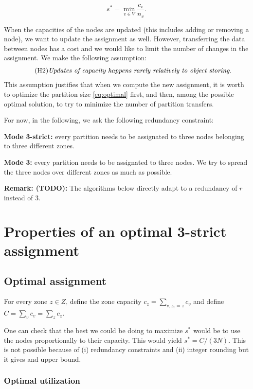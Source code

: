 \documentclass[]{article}
\begin{document}
\begin{equation}
	\label{eq:optimal}
	\tag{OPT}
s^* = \min_{v \in V} \frac{c_v}{n_v}.
\end{equation}

When the capacities of the nodes are updated (this includes adding or removing a node), we want to update the assignment as well. However, transferring the data between nodes has a cost and we would like to limit the number of changes in the assignment. We make the following assumption:
\begin{equation}
	\tag{H2}
	\text{\emph{Updates of capacity happens rarely relatively to object storing.}}
\end{equation}
This assumption justifies that when we compute the new assignment, it is worth to optimize the partition size \eqref{eq:optimal} first, and then, among the possible optimal solution, to try to minimize the number of partition transfers.

For now, in the following, we ask the following redundancy constraint:

\textbf{Mode 3-strict:}  every partition needs to be assignated to three nodes belonging to three different zones.

\textbf{Mode 3:} every partition needs to be assignated to three nodes. We try to spread the three nodes over different zones as much as possible.

\textbf{Remark: (TODO):} The algorithms below directly adapt to a redundancy of $r$ instead of 3.

\section{Properties of an optimal 3-strict assignment}

\subsection{Optimal assignment}
\label{sec:opt_assign}

For every zone $z\in Z$, define the zone capacity $c_z = \sum_{v, z_v=z} c_v$ and define $C = \sum_v c_v = \sum_z c_z$.

One can check that the best we could be doing to maximize $s^*$ would be to use the nodes proportionally to their capacity. This would yield $s^*=C/(3N)$. This is not possible because of (i) redundancy constraints and (ii) integer rounding but it gives and upper bound. 

\subsubsection*{Optimal utilization}
\end{document}
